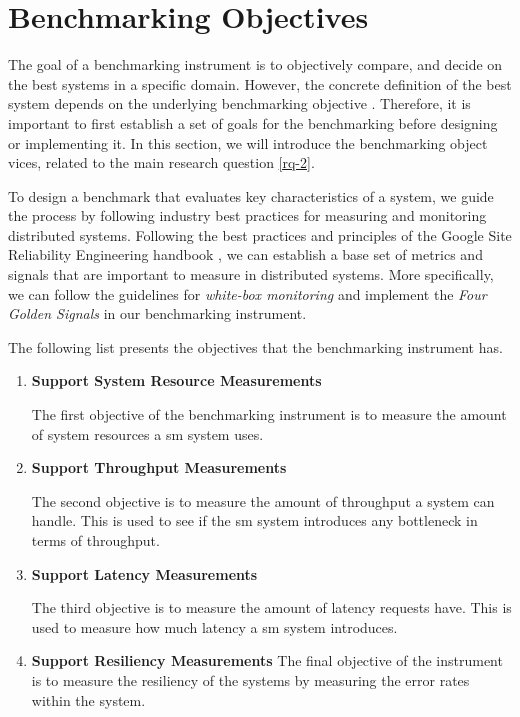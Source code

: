 \section{Benchmarking Objectives}
\label{sec:system:objectives}


The goal of a benchmarking instrument is to objectively compare, and decide on the best systems in a specific domain. However, the concrete definition of the best system depends on the underlying benchmarking objective \cite{folkerts2012benchmarking}. Therefore, it is important to first establish a set of goals for the benchmarking before designing or implementing it. In this section, we will introduce the benchmarking object vices, related to the main research question \ref{rq-2}.


To design a benchmark that evaluates key characteristics of a system, we guide the process by following industry best practices for measuring and monitoring distributed systems. Following the best practices and principles of the Google Site Reliability Engineering handbook \cite{google-sre}, we can establish a base set of metrics and signals that are important to measure in distributed systems. More specifically, we can follow the guidelines for \textit{white-box monitoring} and implement the  \textit{Four Golden Signals} in our benchmarking instrument.

The following list presents the objectives that the benchmarking instrument has.

\begin{enumerate}[label=\textbf{O\arabic*}, leftmargin=3\parindent]
    \item \textbf{Support System Resource Measurements}
    \label{o-1}
    
    The first objective of the benchmarking instrument is to measure the amount of system resources a \gls{sm} system uses.
    
    \item \textbf{Support Throughput Measurements}
    \label{o-2}
    
    The second objective is to measure the amount of throughput a system can handle. This is used to see if the \gls{sm} system introduces any bottleneck in terms of throughput.

    \item \textbf{Support Latency Measurements}
    \label{o-3}
    
    The third objective is to measure the amount of latency requests have. This is used to measure how much latency a \gls{sm} system introduces.
    

    \item \textbf{Support Resiliency Measurements}
    \label{o-4}
    The final objective of the instrument is to measure the resiliency of the systems by measuring the error rates within the system.
    
\end{enumerate}
